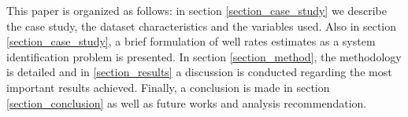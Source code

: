 \documentclass[conference]{IEEEtran}
\begin{document}
This paper is organized as follows: in section \ref{section_case_study} we describe the case study, the dataset characteristics and the variables used. Also in section \ref{section_case_study}, a brief formulation of well rates estimates as a system identification problem is presented. In section \ref{section_method}, the methodology is detailed and in \ref{section_results} a discussion is conducted regarding the most important results achieved. Finally, a conclusion is made in section \ref{section_conclusion} as well as future works and analysis recommendation.

%
%



%
%
\end{document}
